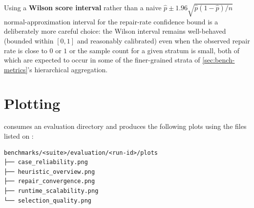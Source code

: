 Using a \textbf{Wilson score interval} rather than a naive
$\hat p \pm 1.96\sqrt{\hat p(1-\hat p)/n}$ normal-approximation interval for
the repair-rate confidence bound is a deliberately more careful choice: the
Wilson interval remains well-behaved (bounded within $[0,1]$ and reasonably
calibrated) even when the observed repair rate is close to $0$ or $1$ or
the sample count for a given stratum is small, both of which are expected
to occur in some of the finer-grained strata of
\cref{sec:bench-metrics}'s hierarchical aggregation.

\section{Plotting}
\label{sec:bench-plotting}

 consumes an evaluation directory and
produces the following plots using the files listed on :

\begin{lstlisting}[numbers=none]
benchmarks/<suite>/evaluation/<run-id>/plots
├── case_reliability.png
├── heuristic_overview.png
├── repair_convergence.png
├── runtime_scalability.png
└── selection_quality.png
\end{lstlisting}

